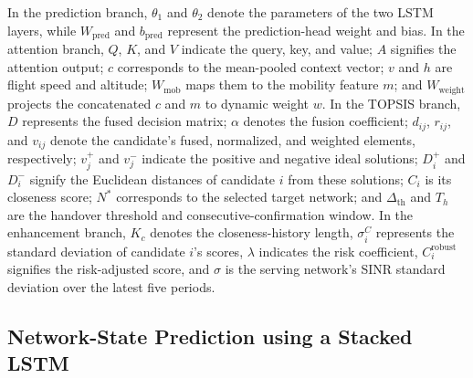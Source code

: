 \documentclass[remotesensing,article,submit,moreauthors]{Definitions/mdpi}
\begin{document}
In the prediction branch, $\theta_1$ and $\theta_2$ denote the parameters of the two LSTM layers, while $W_{\mathrm{pred}}$ and $b_{\mathrm{pred}}$ represent the prediction-head weight and bias. In the attention branch, $Q$, $K$, and $V$ indicate the query, key, and value; $A$ signifies the attention output; $c$ corresponds to the mean-pooled context vector; $v$ and $h$ are flight speed and altitude; $W_{\mathrm{mob}}$ maps them to the mobility feature $m$; and $W_{\mathrm{weight}}$ projects the concatenated $c$ and $m$ to dynamic weight $w$. In the TOPSIS branch, $D$ represents the fused decision matrix; $\alpha$ denotes the fusion coefficient; $d_{ij}$, $r_{ij}$, and $v_{ij}$ denote the candidate's fused, normalized, and weighted elements, respectively; $v_j^+$ and $v_j^-$ indicate the positive and negative ideal solutions; $D_i^+$ and $D_i^-$ signify the Euclidean distances of candidate $i$ from these solutions; $C_i$ is its closeness score; $N^*$ corresponds to the selected target network; and $\Delta_{\mathrm{th}}$ and $T_h$ are the handover threshold and consecutive-confirmation window. In the enhancement branch, $K_c$ denotes the closeness-history length, $\sigma_i^C$ represents the standard deviation of candidate $i$'s scores, $\lambda$ indicates the risk coefficient, $C_i^{\mathrm{robust}}$ signifies the risk-adjusted score, and $\sigma$ is the serving network's SINR standard deviation over the latest five periods.

\subsection{Network-State Prediction using a Stacked LSTM}\label{sec:pred}
\end{document}
